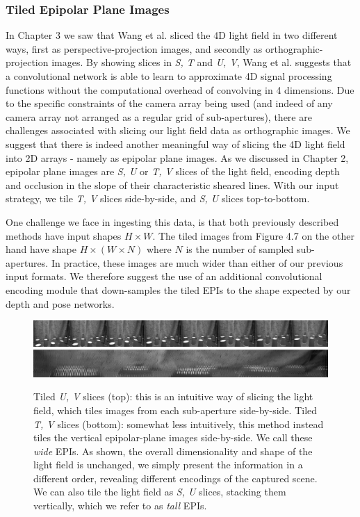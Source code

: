 \subsubsection{Tiled Epipolar Plane Images}
In Chapter 3 we saw that Wang et al. \cite{wang2016lfcnn} sliced the 4D light field in two different ways, first as perspective-projection images, and secondly as orthographic-projection images. By showing slices in \textit{S, T} and \textit{U, V}, Wang et al. suggests that a convolutional network is able to learn to approximate 4D signal processing functions without the computational overhead of convolving in 4 dimensions. Due to the specific constraints of the camera array being used (and indeed of any camera array not arranged as a regular grid of sub-apertures), there are challenges associated with slicing our light field data as orthographic images. We suggest that there is indeed another meaningful way of slicing the 4D light field into 2D arrays - namely as epipolar plane images. As we discussed in Chapter 2, epipolar plane images are \textit{S, U} or \textit{T, V} slices of the light field, encoding depth and occlusion in the slope of their characteristic sheared lines. With our input strategy, we tile \textit{T, V} slices side-by-side, and \textit{S, U} slices top-to-bottom. 

One challenge we face in ingesting this data, is that both previously described methods have input shapes $H \times W$. The tiled images from Figure 4.7 on the other hand have shape $H \times (W \times N)$ where $N$ is the number of sampled sub-apertures. In practice, these images are much wider than either of our previous input formats. We therefore suggest the use of an additional convolutional encoding module that down-samples the tiled EPIs to the shape expected by our depth and pose networks.


\begin{figure}[h]
    \centering 
    \includegraphics[width=6in]{images/epitile_3.png}
    \includegraphics[width=6in]{images/epitile_2.png}
    \caption[Two different ways of slicing the light field]{Tiled \textit{U, V} slices (top): this is an intuitive way of slicing the light field, which tiles images from each sub-aperture side-by-side. Tiled \textit{T, V} slices (bottom): somewhat less intuitively, this method instead tiles the vertical epipolar-plane images side-by-side. We call these \textit{wide} EPIs. As shown, the overall dimensionality and shape of the light field is unchanged, we simply present the information in a different order, revealing different encodings of the captured scene. We can also tile the light field as \textit{S, U} slices, stacking them vertically, which we refer to as \textit{tall} EPIs.}
\end{figure}

